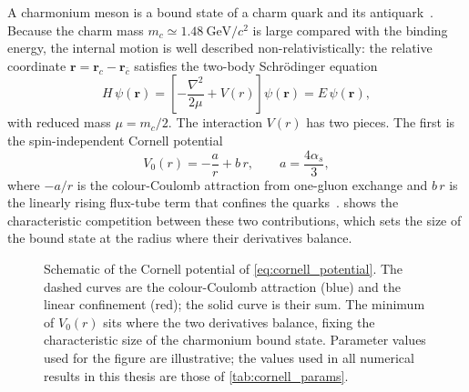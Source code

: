 A charmonium meson is a bound state of a charm quark and its
antiquark~\cite{eichten1978,brambilla2011}. Because the charm mass
$m_c \simeq 1.48~\mathrm{GeV}/c^2$ is large compared with the binding energy,
the internal motion is well described non-relativistically: the relative
coordinate $\mathbf{r} = \mathbf{r}_c - \mathbf{r}_{\bar c}$ satisfies the
two-body Schr\"{o}dinger equation
\begin{equation}
  \label{eq:two_body}
  H\,\psi(\mathbf{r}) =
    \left[-\frac{\nabla^{2}}{2\mu} + V(r)\right]\psi(\mathbf{r})
    = E\,\psi(\mathbf{r}),
\end{equation}
with reduced mass $\mu = m_c/2$. The interaction $V(r)$ has two pieces.
The first is the spin-independent Cornell potential
\begin{equation}
  \label{eq:cornell_potential}
  V_0(r) = -\frac{a}{r} + b\,r,
  \qquad a = \frac{4\alpha_s}{3},
\end{equation}
where $-a/r$ is the colour-Coulomb attraction from one-gluon exchange and
$b\,r$ is the linearly rising flux-tube term that confines the
quarks~\cite{eichten1978}.  shows the
characteristic competition between these two contributions, which sets
the size of the bound state at the radius where their derivatives
balance.

\begin{figure}[htbp]
\centering
{}
\caption{Schematic of the Cornell potential of \cref{eq:cornell_potential}.
  The dashed curves are the colour-Coulomb attraction (blue) and the
  linear confinement (red); the solid curve is their sum. The minimum of
  $V_0(r)$ sits where the two derivatives balance, fixing the
  characteristic size of the charmonium bound state. Parameter values used
  for the figure are illustrative; the values used in all numerical
  results in this thesis are those of \cref{tab:cornell_params}.}
\label{fig:cornell_potential}
\end{figure}

